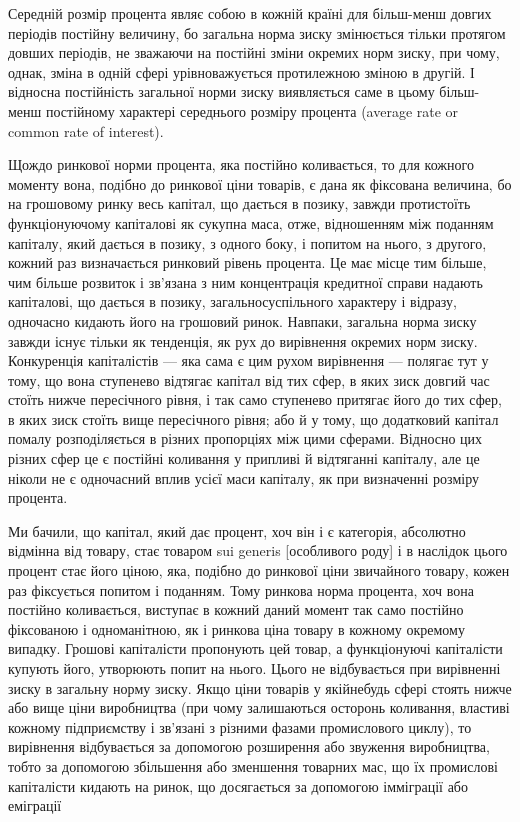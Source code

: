 
Середній розмір процента являє собою в кожній країні для
більш-менш довгих періодів постійну величину, бо загальна норма
зиску змінюється тільки протягом довших періодів, не зважаючи
на постійні зміни окремих норм зиску, при чому, однак, зміна в
одній сфері урівноважується протилежною зміною в другій. І відносна
постійність загальної норми зиску виявляється саме в цьому
більш-менш постійному характері середнього розміру процента
(average rate or common rate of interest).

Щождо ринкової норми процента, яка постійно коливається,
то для кожного моменту вона, подібно до ринкової ціни товарів,
є дана як фіксована величина, бо на грошовому ринку весь
капітал, що дається в позику, завжди протистоїть функціонуючому
капіталові як сукупна маса, отже, відношенням між поданням
капіталу, який дається в позику, з одного боку, і
попитом на нього, з другого, кожний раз визначається ринковий
рівень процента. Це має місце тим більше, чим більше
розвиток і зв’язана з ним концентрація кредитної справи
надають капіталові, що дається в позику, загальносуспільного
характеру і відразу, одночасно кидають його на грошовий
ринок. Навпаки, загальна норма зиску завжди існує тільки як
тенденція, як рух до вирівнення окремих норм зиску. Конкуренція
капіталістів — яка сама є цим рухом вирівнення —
полягає тут у тому, що вона ступенево відтягає капітал від тих
сфер, в яких зиск довгий час стоїть нижче пересічного рівня,
і так само ступенево притягає його до тих сфер, в яких зиск стоїть
вище пересічного рівня; або й у тому, що додатковий капітал
помалу розподіляється в різних пропорціях між цими сферами.
Відносно цих різних сфер це є постійні коливання у припливі й
відтяганні капіталу, але це ніколи не є одночасний вплив усієї
маси капіталу, як при визначенні розміру процента.

Ми бачили, що капітал, який дає процент, хоч він і є категорія,
абсолютно відмінна від товару, стає товаром sui generis
[особливого роду] і в наслідок цього процент стає його ціною,
яка, подібно до ринкової ціни звичайного товару, кожен раз
фіксується попитом і поданням. Тому ринкова норма процента,
хоч вона постійно коливається, виступає в кожний даний момент
так само постійно фіксованою і одноманітною, як і ринкова
ціна товару в кожному окремому випадку. Грошові капіталісти
пропонують цей товар, а функціонуючі капіталісти купують
його, утворюють попит на нього. Цього не відбувається
при вирівненні зиску в загальну норму зиску. Якщо ціни товарів
у якійнебудь сфері стоять нижче або вище ціни виробництва
(при чому залишаються осторонь коливання, властиві кожному
підприємству і зв’язані з різними фазами промислового циклу),
то вирівнення відбувається за допомогою розширення або звуження
виробництва, тобто за допомогою збільшення або зменшення
товарних мас, що їх промислові капіталісти кидають на
ринок, що досягається за допомогою імміграції або еміграції
\parbreak{}  %
